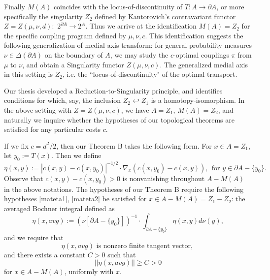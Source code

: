 \documentclass[12pt]{article}
\theoremstyle{definition}
\theoremstyle{remark}
\newcommand{\del}{\partial}
\newcommand{\hh}{\hookleftarrow}
\begin{document}
Finally $M(A)$ coincides with the locus-of-discontinuity of $T: A\to \del A$, or more specifically the singularity $Z_2$ defined by Kantorovich's contravariant functor $Z=Z(\mu, \nu, d):$ $2^{\del A} \to 2^A$. Thus we arrive at the identification $M(A)=Z_2$ for the specific coupling program defined by $\mu, \nu, c$. This identification suggests the following generalization of medial axis transform: for general probability measures $\nu \in \Delta(\del A)$ on the boundary of $A$, we may study the $c$-optimal couplings $\pi$ from $\mu$ to $\nu$, and obtain a Singularity functor $Z(\mu, \nu, c)$. The generalized medial axis in this setting is $Z_2$, i.e. the ``locus-of-discontinuity" of the optimal transport.



Our thesis developed a Reduction-to-Singularity principle, and identifies conditions for which, say, the inclusion $Z_2 \hh Z_1$ is a homotopy-isomorphism. In the above setting with $Z=Z(\mu, \nu, c)$, we have $A=Z_1$, $M(A)=Z_2$, and naturally we inquire whether the hypotheses of our topological theorems are satisfied for any particular costs $c$. 

If we fix $c=d^2/2$, then our Theorem B takes the following form. For $x\in A=Z_1$, let $y_0:=T(x)$. Then we define 
$$\eta(x,y):=| c(x,y)-c(x,y_0) |^{-1/2} \cdot \nabla_x (c(x,y_0) - c(x,y)), ~~\text{for~} y\in \del A - \{y_0\}.$$ Observe that $c(x,y)-c(x,y_0)>0$ is nonvanishing throughout $A-M(A)$ in the above notations. The hypotheses of our Theorem B require the following hypotheses \eqref{mateta1}, \eqref{mateta2} be satisfied for $x\in A- M(A)=Z_1-Z_2$: the averaged Bochner integral defined as \begin{equation} \eta(x,avg):=(\nu[\del A-\{y_0\}])^{-1} \cdot \int_{\del A - \{y_0\}} \eta(x,y) d\nu(y),\end{equation} and we require that \begin{equation}\label{mateta1}   \eta(x,avg) \text{~is nonzero finite tangent vector,~}\end{equation} and there exists a constant $C>0$ such that \begin{equation}\label{mateta2} ||\eta(x,avg)|| \geq C >0\end{equation} for $x\in A- M(A)$, uniformly with $x$. 



\end{document}
